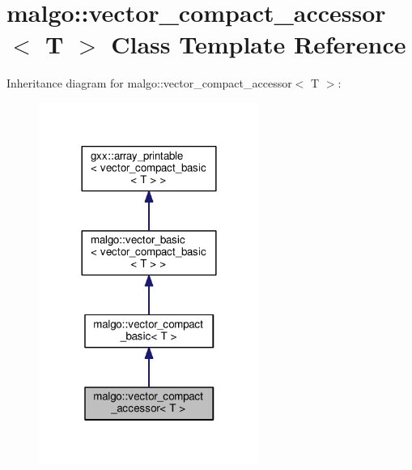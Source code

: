 \hypertarget{classmalgo_1_1vector__compact__accessor}{}\section{malgo\+:\+:vector\+\_\+compact\+\_\+accessor$<$ T $>$ Class Template Reference}
\label{classmalgo_1_1vector__compact__accessor}


Inheritance diagram for malgo\+:\+:vector\+\_\+compact\+\_\+accessor$<$ T $>$\+:
\nopagebreak
\begin{figure}[H]
\begin{center}
\leavevmode
\includegraphics[width=204pt]{classmalgo_1_1vector__compact__accessor__inherit__graph}
\end{center}
\end{figure}


